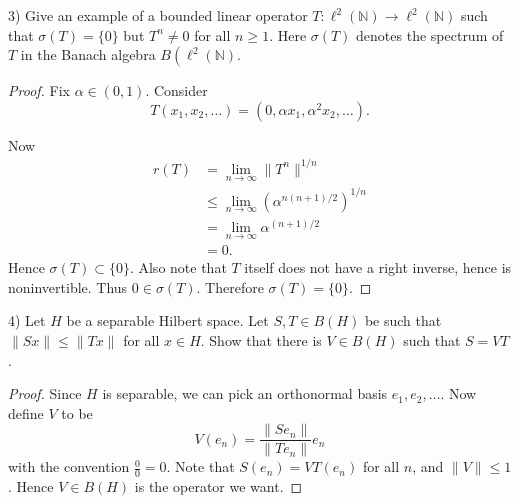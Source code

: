 \begin{problem}
	3) Give an example of a bounded linear operator $T: \ell^2(\mathbb{N}) \rightarrow \ell^2(\mathbb{N})$ such that $\sigma(T)=\{0\}$ but $T^n \neq 0$ for all $n \geq 1$. Here $\sigma(T)$ denotes the spectrum of $T$ in the Banach algebra $B\left(\ell^2(\mathbb{N})\right.$.
\end{problem}
\begin{proof}
	Fix $\alpha \in \left( 0, 1 \right) $.
	Consider
	\[
		T(x_1, x_2, \ldots)
		= (0, \alpha x_1, \alpha^2 x_2, \ldots)
	.\] 

	Now
	\begin{align*}
		r(T)
		&= \lim_{n \to \infty } \|T^n\|^{1 / n} \\
		&\le \lim_{n \to \infty} \left( \alpha^{n(n+1) /2} \right) ^{1 / n} \\
		&= \lim_{n \to \infty } \alpha^{(n + 1) / 2} \\
		&= 0 
	.\end{align*}
	Hence $\sigma(T) \subset \{0\} $. Also note that $T$ itself does not have a right inverse, hence is noninvertible. Thus $0 \in \sigma(T)$. Therefore $\sigma(T) = \{0\} $.
\end{proof}


\begin{problem}
	4) Let $H$ be a separable Hilbert space. Let $S, T \in B(H)$ be such that $\|S x\| \leq\|T x\|$ for all $x \in H$. Show that there is $V \in B(H)$ such that $S=V T$.
\end{problem}
\begin{proof}
	Since $H$ is separable, we can pick an orthonormal basis $e_1, e_2, \ldots$. Now define $V$ to be
	\[
		V(e_n) = \frac{\|S e_n\|}{\|T e_n\|}e_n
	\] 
	with the convention $\frac{0}{0} = 0$. Note that $S(e_n) = V T(e_n)$ for all $n$, and $\|V\| \le 1$. Hence $V \in B(H)$ is the operator we want.
\end{proof}

